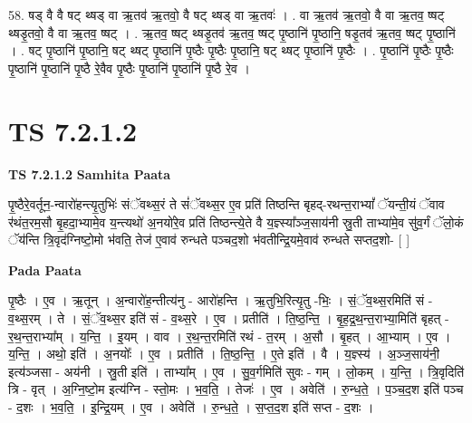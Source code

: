 \documentclass[17pt]{extarticle}
\begin{document}
58. षड् वै वै षट् थ्षड् वा ऋ॒तव॑ ऋ॒तवो॒ वै षट् थ्षड् वा ऋ॒तवः॑ । . वा ऋ॒तव॑ ऋ॒तवो॒ वै वा ऋ॒तव॒ ष्षट् थ्षडृ॒तवो॒ वै वा ऋ॒तव॒ ष्षट् । . ऋ॒तव॒ ष्षट् थ्षडृ॒तव॑ ऋ॒तव॒ ष्षट् पृ॒ष्ठानि॑ पृ॒ष्ठानि॒ षडृ॒तव॑ ऋ॒तव॒ ष्षट् पृ॒ष्ठानि॑ । . षट् पृ॒ष्ठानि॑ पृ॒ष्ठानि॒ षट् थ्षट् पृ॒ष्ठानि॑ पृ॒ष्ठैः पृ॒ष्ठैः पृ॒ष्ठानि॒ षट् थ्षट् पृ॒ष्ठानि॑ पृ॒ष्ठैः । . पृ॒ष्ठानि॑ पृ॒ष्ठैः पृ॒ष्ठैः पृ॒ष्ठानि॑ पृ॒ष्ठानि॑ पृ॒ष्ठै रे॒वैव पृ॒ष्ठैः पृ॒ष्ठानि॑ पृ॒ष्ठानि॑ पृ॒ष्ठै रे॒व । \newline
\pagebreak
{}

\section{ TS 7.2.1.2 }

\textbf{TS 7.2.1.2 } \newline
\textbf{Samhita Paata} \newline

पृ॒ष्ठैरे॒वर्तून॒-न्वारो॑हन्त्यृ॒तुभिः॑ संॅवथ्स॒रं ते सं॑ॅवथ्स॒र ए॒व प्रति॑ तिष्ठन्ति बृहद्-रथन्त॒राभ्यां᳚ ॅयन्ती॒यं ॅवाव र॑थंत॒रम॒सौ बृ॒हदा॒भ्यामे॒व य॒न्त्यथो॑ अ॒नयो॑रे॒व प्रति॑ तिष्ठन्त्ये॒ते वै य॒ज्ञ्स्या᳚ञ्ज॒साय॑नी स्रु॒ती ताभ्या॑मे॒व सु॑व॒र्गं ॅलो॒कं ॅय॑न्ति त्रि॒वृद॑ग्निष्टो॒मो भ॑वति॒ तेज॑ ए॒वाव॑ रुन्धते पञ्चद॒शो भ॑वतीन्द्रि॒यमे॒वाव॑ रुन्धते सप्तद॒शो- [  ] \newline

\textbf{Pada Paata} \newline

पृ॒ष्ठैः । ए॒व । ऋ॒तून् । अ॒न्वारो॑ह॒न्तीत्य॑नु - आरो॑हन्ति । ऋ॒तुभि॒रित्यृ॒तु -भिः॒ । सं॒ॅव॒थ्स॒रमिति॑ सं - व॒थ्स॒रम् । ते । सं॒ॅव॒थ्स॒र इति॑ सं - व॒थ्स॒रे । ए॒व । प्रतीति॑ । ति॒ष्ठ॒न्ति॒ । बृ॒ह॒द्र॒थ॒न्त॒राभ्या॒मिति॑ बृहत् - र॒थ॒न्त॒राभ्या᳚म् । य॒न्ति॒ । इ॒यम् । वाव । र॒थ॒न्त॒रमिति॑ रथं - त॒रम् । अ॒सौ । बृ॒हत् । आ॒भ्याम् । ए॒व । य॒न्ति॒ । अथो॒ इति॑ । अ॒नयोः᳚ । ए॒व । प्रतीति॑ । ति॒ष्ठ॒न्ति॒ । ए॒ते इति॑ । वै । य॒ज्ञ्स्य॑ । अ॒ञ्ज॒साय॑नी॒ इत्य॑ञ्जसा - अय॑नी । स्रु॒ती इति॑ । ताभ्या᳚म् । ए॒व । सु॒व॒र्गमिति॑ सुवः - गम् । लो॒कम् । य॒न्ति॒ । त्रि॒वृदिति॑ त्रि - वृत् । अ॒ग्नि॒ष्टो॒म इत्य॑ग्नि - स्तो॒मः । भ॒व॒ति॒ । तेजः॑ । ए॒व । अवेति॑ । रु॒न्ध॒ते॒ । प॒ञ्च॒द॒श इति॑ पञ्च - द॒शः । भ॒व॒ति॒ । इ॒न्द्रि॒यम् । ए॒व । अवेति॑ । रु॒न्ध॒ते॒ । स॒प्त॒द॒श इति॑ सप्त - द॒शः ।  \newline
\end{document}
